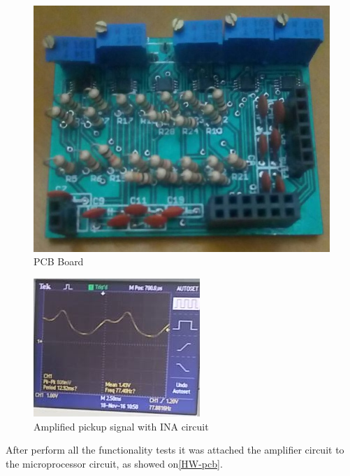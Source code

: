 \begin{figure}[!htpb]
  \centering
  \caption{PCB Board}
  \label{assembled-pcb}
  \includegraphics[scale=0.5]{images/INA/assembled-pcb.jpeg}
\end{figure}

\begin{figure}[!htpb]
\centering
\caption{Amplified pickup signal with INA circuit}
\label{INA-result}
\includegraphics[scale=1]{images/INA/result}
\end{figure}

After perform all the functionality tests it was attached the amplifier circuit to the microprocessor
circuit, as showed on\autoref{HW-pcb}.

